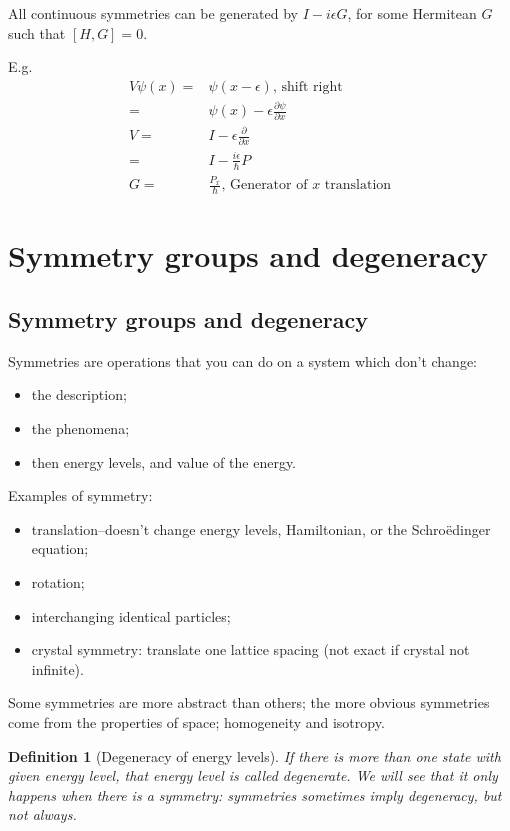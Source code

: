 \documentclass[]{article}
\newtheorem{defn}[thm]{Definition}
\begin{document}
All continuous symmetries can be generated by $I-i \epsilon G$, for some Hermitean $G$ such that $[H,G]=0$.

E.g.
\begin{align*}
V \psi(x) = & \psi(x-\epsilon)\text{, shift right}\\
=& \psi(x) - \epsilon \frac{\partial \psi}{\partial x}\\
V =& I -  \epsilon \frac{\partial }{\partial x}\\
=& I - \frac{i \epsilon}{\hslash}P\\
G =& \frac{P_x}{\hslash}\text{, Generator of $x$ translation}
\end{align*}


\section{Symmetry groups and degeneracy}\label{seq:symmetry:degeneracy}

\subsection{Symmetry groups and degeneracy}

Symmetries are operations that you can do on a system which don't change:
\begin{itemize}
	\item the description;
	\item the phenomena;
	\item then energy levels, and value of the energy.
\end{itemize}

Examples of symmetry:
\begin{itemize}
	\item translation--doesn't change energy levels, Hamiltonian, or the Schro\"edinger equation;
	\item rotation;
	\item interchanging identical particles;
	\item crystal symmetry: translate one lattice spacing (not exact if crystal not infinite).
\end{itemize}
Some symmetries are more abstract than others; the more obvious symmetries come from the properties of space; homogeneity and isotropy.

\begin{defn}[Degeneracy of energy levels]
	If there is more than one state with given energy level, that energy level is called degenerate. We will see that it only happens when there is a symmetry: symmetries sometimes imply degeneracy, but not always.
\end{defn}
\end{document}
